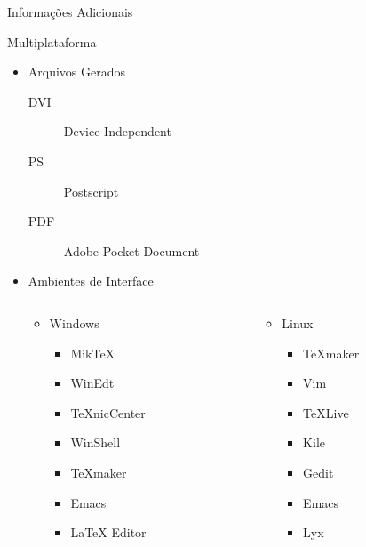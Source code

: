 \documentclass[hyperref={pdfpagelabels=false}]{beamer}
\begin{document}
\begin{frame}{Informações Adicionais}
    \begin{center}
        \huge{Multiplataforma}
    \end{center}
    \begin{itemize}
        \item Arquivos Gerados
        \begin{description}
        \item[DVI] Device Independent
        \item[PS]  Postscript
        \item[PDF] Adobe Pocket Document
        \end{description}
        \pause{}
        \item Ambientes de Interface
        \begin{columns}[c]
            \begin{column}{0.5\textwidth}
                \begin{itemize}
                    \item Windows
                    \begin{itemize}
                        \item Mik\TeX{}
                        \item WinEdt
                        \item \TeX{}nicCenter
                        \item WinShell
                        \item \TeX{}maker
                        \item Emacs
                        \item \LaTeX{} Editor
                    \end{itemize}
                \end{itemize}
            \end{column}
            \begin{column}{0.5\textwidth}
                \begin{itemize}
                    \item Linux
                    \begin{itemize}
                        \item \TeX{}maker
                        \item Vim
                        \item \TeX{}Live
                        \item Kile
                        \item Gedit
                        \item Emacs
                        \item Lyx
                    \end{itemize}
                \end{itemize}
            \end{column}
        \end{columns}
    \end{itemize}
\end{frame}
\end{document}
